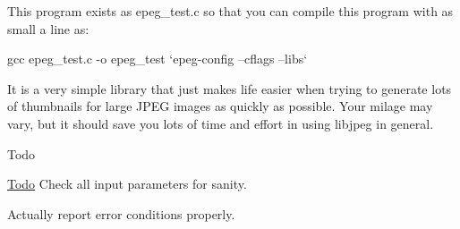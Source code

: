 This program exists as epeg\+\_\+test.\+c so that you can compile this program with as small a line as\+:

\begin{DoxyVerb}gcc epeg_test.c -o epeg_test `epeg-config --cflags --libs`
\end{DoxyVerb}


It is a very simple library that just makes life easier when trying to generate lots of thumbnails for large J\+P\+E\+G images as quickly as possible. Your milage may vary, but it should save you lots of time and effort in using libjpeg in general.

\begin{DoxyRefDesc}{Todo}
\item[\hyperlink{todo__todo000001}{Todo}]Check all input parameters for sanity. 

Actually report error conditions properly.\end{DoxyRefDesc}

